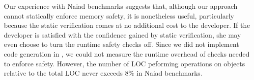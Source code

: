 Our experience with Naiad benchmarks suggests that, although our
approach cannot statically enforce memory safety, it is nonetheless
useful, particularly because the static verification comes at no
additional cost to the developer. If the developer is satisfied with
the confidence gained by static verification, she may even choose to
turn the runtime safety checks off. Since we did not implement code
generation in \namec, we could not measure the runtime overhead of
checks needed to enforce safety. However, the number of LOC peforming
operations on  objects relative to the total LOC never
exceeds 8\% in Naiad benchmarks. 


